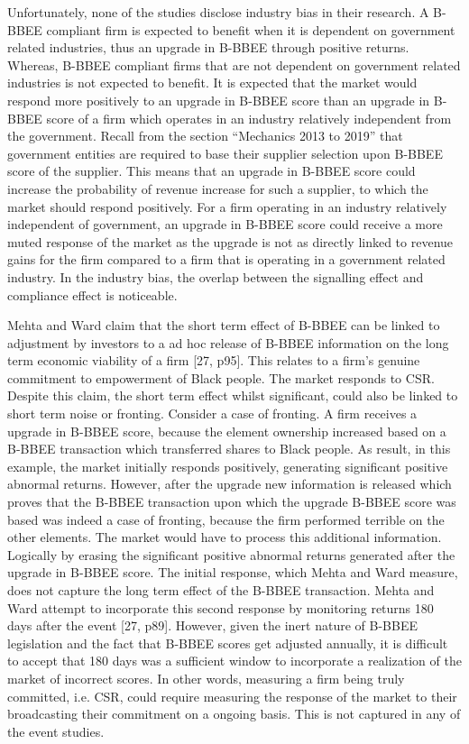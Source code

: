 Unfortunately, none of the studies disclose industry bias in their research. A B-BBEE compliant firm is expected to benefit when it is dependent on government related industries, thus an upgrade in B-BBEE through positive returns. Whereas, B-BBEE compliant firms that are not dependent on government related industries is not expected to benefit.  It is expected that the market would respond more positively to an upgrade in B-BBEE score than an upgrade in B-BBEE score of a firm which operates in an industry relatively independent from the government. Recall from the section “Mechanics 2013 to 2019” that government entities are required to base their supplier selection upon B-BBEE score of the supplier. This means that an upgrade in B-BBEE score could increase the probability of revenue increase for such a supplier, to which the market should respond positively. For a firm operating in an industry relatively independent of government, an upgrade in B-BBEE score could receive a more muted response of the market as the upgrade is not as directly linked to revenue gains for the firm compared to a firm that is operating in a government related industry. In the industry bias, the overlap between the signalling effect and compliance effect is noticeable.

Mehta and Ward claim that the short term effect of B-BBEE can be linked to adjustment by investors to a ad hoc release of B-BBEE  information on the long term  economic viability of a firm [27, p95]. This relates to a firm’s genuine commitment to empowerment of Black people. The market responds to CSR. Despite this claim, the short term effect whilst significant, could also be linked to short term noise or fronting. Consider a case of fronting. A firm receives a upgrade in B-BBEE score, because the element ownership increased based on a B-BBEE transaction which transferred shares to Black people. As result, in this example, the market initially responds positively, generating significant positive abnormal returns. However, after the upgrade new information is released which proves that the B-BBEE transaction upon which the upgrade B-BBEE score was based was indeed a case of fronting, because the firm performed terrible on the other elements. The market would have to process this additional information. Logically by erasing the significant positive abnormal returns generated after the upgrade in B-BBEE score. The  initial response, which Mehta and Ward measure, does not capture the long term effect of the B-BBEE transaction. Mehta and Ward attempt to incorporate this second response by monitoring returns 180 days after the event [27, p89]. However, given the inert nature of B-BBEE legislation and the fact that B-BBEE scores get adjusted annually, it is difficult to accept that 180 days was a sufficient window to incorporate a realization of the market of incorrect scores. In other words, measuring a firm being truly committed, i.e. CSR, could require measuring the response of the market to their broadcasting their commitment on a ongoing basis. This is not captured in any of the event studies.
